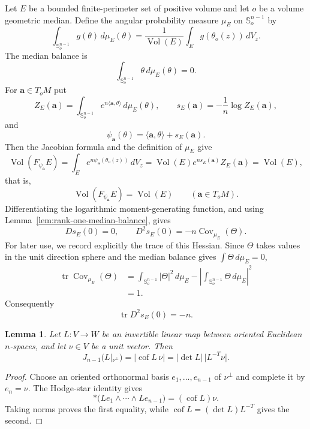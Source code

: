 \documentclass[11pt,reqno]{amsart}
\numberwithin{equation}{section}
\newtheorem{lemma}[theorem]{Lemma}
\theoremstyle{definition}
\theoremstyle{remark}
\newcommand{\Vol}{\operatorname{Vol}}
\newcommand{\cof}{\operatorname{cof}}
\begin{document}
Let $E$ be a bounded finite-perimeter set of positive volume and let $o$ be a
volume geometric median.  Define the angular probability measure $\mu_E$ on
$\mathbb S_o^{n-1}$ by
\[
\int_{\mathbb S_o^{n-1}}g(\theta)\,d\mu_E(\theta)
=
\frac{1}{\Vol(E)}
\int_E g(\theta_o(z))\,dV_z.
\]
The median balance is
\[
\int_{\mathbb S_o^{n-1}}\theta\,d\mu_E(\theta)=0.
\]
For $\mathbf a\in T_oM$ put
\[
Z_E(\mathbf a)
=
\int_{\mathbb S_o^{n-1}}
e^{n\langle\mathbf a,\theta\rangle}\,d\mu_E(\theta),
\qquad
s_E(\mathbf a)
=
-\frac{1}n\log Z_E(\mathbf a),
\]
and
\begin{equation}
\psi_{\mathbf a}(\theta)
=
\langle\mathbf a,\theta\rangle+s_E(\mathbf a).
\label{eq:rank-one-exact-volume-exponent}
\end{equation}
Then the Jacobian formula and the definition of $\mu_E$ give
\[
\Vol(F_{\psi_{\mathbf a}}E)
=
\int_Ee^{n\psi_{\mathbf a}(\theta_o(z))}\,dV_z
=
\Vol(E)e^{ns_E(\mathbf a)}Z_E(\mathbf a)
=
\Vol(E),
\]
that is,
\[
\Vol(F_{\psi_{\mathbf a}}E)=\Vol(E)
\qquad(\mathbf a\in T_oM).
\]
Differentiating the logarithmic moment-generating function, and using
Lemma~\ref{lem:rank-one-median-balance}, gives
\[
Ds_E(0)=0,
\qquad
D^2s_E(0)=-n\operatorname{Cov}_{\mu_E}(\Theta).
\]
For later use, we record explicitly the trace of this Hessian.  Since
$\Theta$ takes values in the unit direction sphere and the median balance gives
$\int \Theta\,d\mu_E=0$,
\[
\begin{aligned}
\operatorname{tr}\operatorname{Cov}_{\mu_E}(\Theta)
&=
\int_{\mathbb S_o^{n-1}}|\Theta|^2\,d\mu_E
-
\left|\int_{\mathbb S_o^{n-1}}\Theta\,d\mu_E\right|^2\\
&=1.
\end{aligned}
\]
Consequently
\begin{equation}
\operatorname{tr}D^2s_E(0)=-n.
\label{eq:rank-one-log-partition-trace}
\end{equation}


\begin{lemma}
\label{lem:cofactor}
Let $L:V\to W$ be an invertible linear map between oriented Euclidean
$n$-spaces, and let $\nu\in V$ be a unit vector.  Then
\begin{equation}
 J_{n-1}(L|_{\nu^\perp})
 =|\cof L\,\nu|
 =|\det L|\,|L^{-T}\nu|.
 \label{eq:cofactor}
\end{equation}
\end{lemma}

\begin{proof}
Choose an oriented orthonormal basis $e_1,\ldots,e_{n-1}$ of $\nu^\perp$ and
complete it by $e_n=\nu$.  The Hodge-star identity gives
\[
 *\bigl(Le_1\wedge\cdots\wedge Le_{n-1}\bigr)=(\cof L)\nu.
\]
Taking norms proves the first equality, while
$\cof L=(\det L)L^{-T}$ gives the second.
\end{proof}
\end{document}

